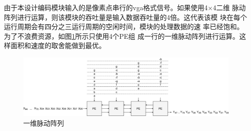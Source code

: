 \documentclass{article}
\numberwithin {equation}{section}
\begin{document}
\begin{spacing}{1.25}
      由于本设计编码模块输入的是像素点串行的vga格式信号。如果使用4×4二维
      脉动阵列进行运算，则该模块的吞吐量是输入数据吞吐量的4倍。这代表该模
      块在每个运行周期会有四分之三运行周期的空闲时间，模块的处理数据的速
      率已经饱和。为了不浪费资源，如图\ref{一维脉动阵列}所示只使用4个PE组
      成一行的一维脉动阵列进行运算。这样面积和速度的取舍能做到最优。
      \begin{figure}[H]
        \centering
        \includegraphics[scale=0.8]{./pictures/1D-DCT.png}
        \caption{一维脉动阵列}
        \label{一维脉动阵列}
      \end{figure}


\end{spacing}
\end{document}

